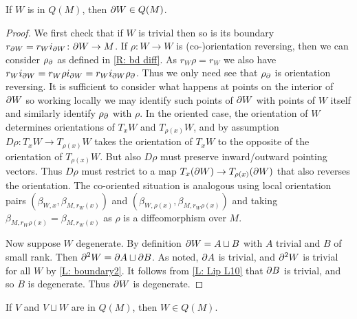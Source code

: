 \begin{lemma}\label{L: bd defined}
If $W$ is in $Q(M)$, then $\partial W \in Q(M)$.
\end{lemma}
\begin{proof}
We first check that if $W$ is trivial then so is its boundary $r_{\partial W} = r_Wi_{\partial W} \colon \partial W \to M$. If $\rho \colon W \to W$ is (co-)orientation reversing, then we can consider $\rho_\partial$ as defined in \cref{R: bd diff}. As $r_W\rho = r_W$ we also have $r_Wi_{\partial W} = r_W\rho i_{\partial W} = r_W i_{\partial W} \rho_\partial$. Thus we only need see that $\rho_\partial$ is orientation reversing. It is sufficient to consider what happens at points on the interior of $\partial W$ so working locally we may identify such points of $\partial W$ with points of $W$ itself and similarly identify $\rho_\partial$ with $\rho$. In the oriented case, the orientation of $W$ determines orientations of $T_xW$ and $T_{\rho(x)}W$, and by assumption $D\rho: T_xW \to T_{\rho(x)}W$ takes the orientation of $T_xW$ to the opposite of the orientation of $T_{\rho(x)}W$. But also $D\rho$ must preserve inward/outward pointing vectors. Thus $D\rho$ must restrict to a map $T_x (\partial W) \to T_{\rho(x)}(\partial W)$ that also reverses the orientation. The co-oriented situation is analogous using local orientation pairs $\left(\beta_{W,x}, \beta_{M,r_W(x)}\right)$ and $\left(\beta_{W,\rho(x)}, \beta_{M,r_W\rho(x)}\right)$ and taking $\beta_{M,r_W\rho(x)} = \beta_{M,r_W(x)}$ as $\rho$ is a diffeomorphism over $M$.

Now suppose $W$ degenerate. By definition $\partial W = A \sqcup B$ with $A$ trivial and $B$ of small rank. Then $\partial^2 W = \partial A \sqcup \partial B$. As noted, $\partial A$ is trivial, and $\partial^2 W$ is trivial for all $W$ by \cref{L: boundary2}. It follows from \cref{L: Lip L10} that $\partial B$ is trivial, and so $B$ is degenerate. Thus $\partial W$ is degenerate.
\end{proof}

\begin{lemma}\label{L: Lipy12}
If $V$ and $V \sqcup W$ are in $Q(M)$, then $W \in Q(M)$.
\end{lemma}

